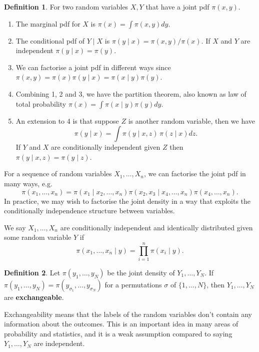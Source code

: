 \documentclass[
]{book}
\theoremstyle{definition}
\newtheorem{definition}{Definition}[chapter]
\theoremstyle{definition}
\theoremstyle{definition}
\theoremstyle{definition}
\theoremstyle{remark}
\begin{document}
\begin{definition}
For two random variables \(X,Y\) that have a joint pdf \(\pi(x,y)\).

\begin{enumerate}
\def\labelenumi{\arabic{enumi}.}
\item
  The marginal pdf for \(X\) is \(\pi(x) = \int \pi(x,y)dy\).
\item
  The conditional pdf of \(Y\mid X\) is \(\pi(y\mid x) = \pi(x,y)/\pi(x)\). If \(X\) and \(Y\) are independent \(\pi(y \mid x) = \pi(y)\).
\item
  We can factorise a joint pdf in different ways since \(\pi(x,y) = \pi(x)\pi(y\mid x) = \pi(x\mid y)\pi(y)\).
\item
  Combining 1, 2 and 3, we have the partition theorem, also known as law of total probability \(\pi(x) = \int\pi(x\mid y)\pi(y) dy\).
\item
  An extension to 4 is that suppose \(Z\) is another random variable, then we have
  \[
  \pi(y \mid x) = \int \pi(y \mid x, z) \, \pi(z\mid x)dz.
  \]
  If \(Y\) and \(X\) are conditionally independent given \(Z\) then \(\pi(y \mid x, z) = \pi(y \mid z)\).
\end{enumerate}

For a sequence of random variables \(X_1,\dotsc,X_n\), we can factorise the joint pdf in many ways, e.g.~
\[
\pi(x_1,\dotsc,x_n) = \pi(x_1\mid x_2,\dotsc,x_n)\pi(x_2,x_3\mid x_4,\dotsc,x_n)\pi(x_4,\dotsc,x_n).
\]
In practice, we may wish to factorise the joint density in a way that exploits the conditionally independence structure between variables.

We say \(X_1,\dotsc,X_n\) are conditionally independent and identically distributed given some random variable \(Y\) if
\[
\pi(x_1,\dotsc,x_n\mid y) = \prod_{i=1}^n \pi(x_i\mid y). 
\]
\end{definition}

\begin{definition}
Let \(\pi(y_1, \ldots, y_N)\) be the joint density of \(Y_1, \ldots, Y_N\). If \(\pi(y_1, \ldots, y_N) = \pi(y_{\sigma_1}, \ldots, y_{\sigma_N})\) for a permutations \(\sigma\) of \(\{1, \ldots, N\}\), then \(Y_1, \ldots, Y_N\) are \textbf{exchangeable}.
\end{definition}

Exchangeability means that the labels of the random variables don't contain any information about the outcomes. This is an important idea in many areas of probability and statistics, and it is a weak assumption compared to saying \(Y_1,\dotsc,Y_N\) are independent.
\end{document}
